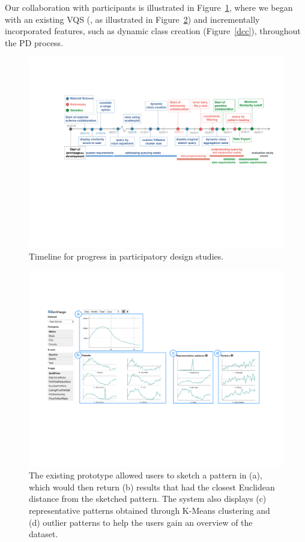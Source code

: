  \npar Our collaboration with participants is illustrated in Figure~\ref{timeline}, where we began with an existing VQS (\zv, as illustrated in Figure~\ref{oldZV}) and incrementally incorporated features, such as dynamic class creation (Figure~\ref{dcc}), throughout the PD process.
 \begin{figure}[h!]
 	\centering
   \includegraphics[width=\linewidth]{figures/timeline.pdf}
 	\caption{Timeline for progress in participatory design studies.}
 	\label{timeline}
 \end{figure}
 \begin{figure}[h!]
 	\centering
 	\includegraphics[width=0.9\linewidth]{figures/oldZV_nozql.pdf}
 	\caption{The existing \zv prototype allowed users to sketch a pattern in (a), which would then return (b) results that had the closest Euclidean distance from the sketched pattern. The system also displays (c) representative patterns obtained through K-Means clustering and (d) outlier patterns to help the users gain an overview of the dataset.}
 	\label{oldZV}
 \end{figure}
